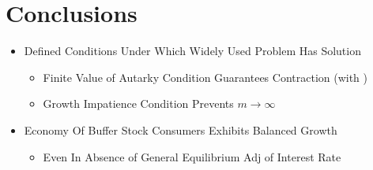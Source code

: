\documentclass[pdflatex]{beamer}
\providecommand{\texnameMaster}{BufferStockTheory}%
\begin{document}
\section{Conclusions}
\begin{frame}

\begin{itemize}
\item Defined Conditions Under Which Widely Used Problem Has Solution
\begin{itemize}
\item Finite Value of Autarky Condition Guarantees Contraction (with \WRIC)
\item Growth Impatience Condition Prevents $m \rightarrow \infty$
\end{itemize}
\item Economy Of Buffer Stock Consumers Exhibits Balanced Growth
\begin{itemize}
\item Even In Absence of General Equilibrium Adj of Interest Rate
\end{itemize}
\end{itemize}

\end{frame}

\def\newblock{\hskip .11em plus .33em minus .07em}

\begin{frame}

\renewcommand{\bibsection}{\subsubsection*{\bibname }}

\tiny 



\end{frame}
\end{document}
